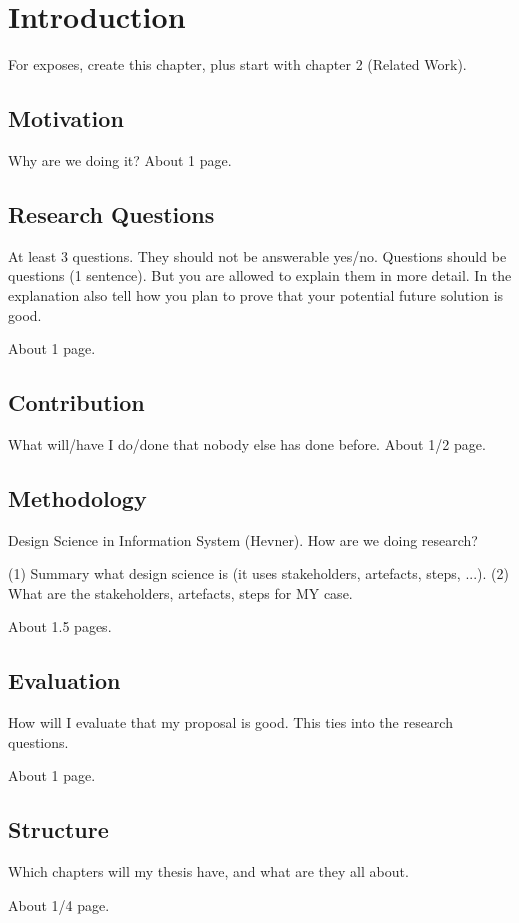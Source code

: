 \chapter{Introduction}
\label{sec:intro}

For exposes, create this chapter, plus start with chapter 2 (Related Work).

\section{Motivation}
\label{sec:intro:mo}

Why are we doing it? About 1 page.

\section{Research Questions}
\label{sec:intro:rq}

At least 3 questions. They should not be answerable yes/no. Questions should be
questions (1 sentence). But you are allowed to explain them in more detail. In
the explanation also tell how you plan to prove that your potential future
solution is good.

About 1 page.

\section{Contribution}
\label{sec:intro:con}

What will/have I do/done that nobody else has done before. About 1/2 page.

\section{Methodology}
\label{sec:intro:con}

Design Science in Information System (Hevner). How are we doing research?

(1) Summary what design science is (it uses stakeholders, artefacts, steps,
...). (2) What are the stakeholders, artefacts, steps for MY case.

About 1.5 pages.

\section{Evaluation}
\label{sec:intro:ev}

How will I evaluate that my proposal is good. This ties into the research questions.

About 1 page.

\section{Structure}
\label{sec:intro:struct}

Which chapters will my thesis have, and what are they all about.

About 1/4 page.
